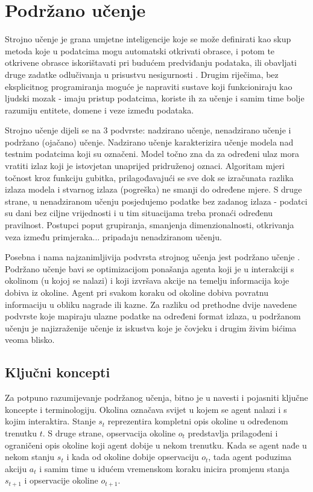 \chapter{Podržano učenje}

Strojno učenje  je grana umjetne inteligencije  koje se može definirati kao skup metoda koje u podatcima mogu automatski otkrivati obrasce, i potom te otkrivene obrasce iskorištavati pri budućem predviđanju podataka, ili obavljati druge zadatke odlučivanja u prisustvu nesigurnosti \cite{CupicUvod}. Drugim riječima, bez eksplicitnog programiranja moguće je napraviti sustave koji funkcioniraju kao ljudski mozak - imaju pristup podatcima, koriste ih za učenje i samim time bolje razumiju entitete, domene i veze između podataka. 

Strojno učenje dijeli se na 3 podvrste: nadzirano učenje, nenadzirano učenje i podržano (ojačano) učenje. Nadzirano učenje  karakterizira učenje modela nad testnim podatcima koji su označeni. Model točno zna da za određeni ulaz mora vratiti izlaz koji je istovjetan unaprijed pridruženoj oznaci. Algoritam mjeri točnost kroz funkciju gubitka, prilagođavajući se sve dok se izračunata razlika izlaza modela i stvarnog izlaza (pogreška) ne smanji do određene mjere. S druge strane, u nenadziranom učenju  posjedujemo podatke bez zadanog izlaza - podatci su dani bez ciljne vrijednosti i u tim situacijama treba pronaći određenu pravilnost. Postupci poput grupiranja, smanjenja dimenzionalnosti, otkrivanja veza između primjeraka... pripadaju nenadziranom učenju.

Posebna i nama najzanimljivija podvrsta strojnog učenja jest podržano učenje . Podržano učenje bavi se optimizacijom ponašanja agenta koji je u interakciji s okolinom (u kojoj se nalazi) i koji izvršava akcije na temelju informacija koje dobiva iz okoline. Agent pri svakom koraku od okoline dobiva povratnu informaciju u obliku nagrade ili kazne. Za razliku od prethodne dvije navedene podvrste koje mapiraju ulazne podatke na određeni format izlaza, u podržanom učenju je najizraženije učenje iz iskustva koje je čovjeku i drugim živim bićima veoma blisko.

\section{Ključni koncepti}

Za potpuno razumijevanje podržanog učenja, bitno je u navesti i pojasniti ključne koncepte i terminologiju. Okolina  označava svijet u kojem se agent nalazi i s kojim interaktira. Stanje $s_t$  reprezentira kompletni opis okoline u određenom trenutku $t$. S druge strane, opservacija okoline $o_t$  predstavlja prilagođeni i ograničeni opis okoline koji agent dobije u nekom trenutku. Kada se agent nađe u nekom stanju $s_t$ i kada od okoline dobije opservaciju $o_t$, tada agent poduzima akciju $a_t$  i samim time u idućem vremenskom koraku inicira promjenu stanja $s_{t+1}$ i opservacije okoline $o_{t+1}$. 

